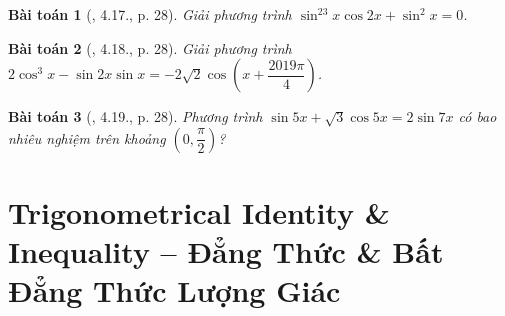 \documentclass{article}
\newtheorem{baitoan}{Bài toán}
\begin{document}
\begin{baitoan}[\cite{Hung_nang_cao_phat_trien_Toan_11_tap_1}, 4.17., p. 28]
	Giải phương trình $\sin^23x\cos2x + \sin^2x = 0$.
\end{baitoan}

\begin{baitoan}[\cite{Hung_nang_cao_phat_trien_Toan_11_tap_1}, 4.18., p. 28]
	Giải phương trình $2\cos^3x - \sin2x\sin x = -2\sqrt{2}\cos\left(x + \dfrac{2019\pi}{4}\right)$.
\end{baitoan}

\begin{baitoan}[\cite{Hung_nang_cao_phat_trien_Toan_11_tap_1}, 4.19., p. 28]
	Phương trình $\sin5x + \sqrt{3}\cos5x = 2\sin7x$ có bao nhiêu nghiệm trên khoảng $\left(0,\dfrac{\pi}{2}\right)$?
\end{baitoan}


\section{Trigonometrical Identity \& Inequality -- Đẳng Thức \& Bất Đẳng Thức Lượng Giác}


\printbibliography[heading=bibintoc]
	
\end{document}
